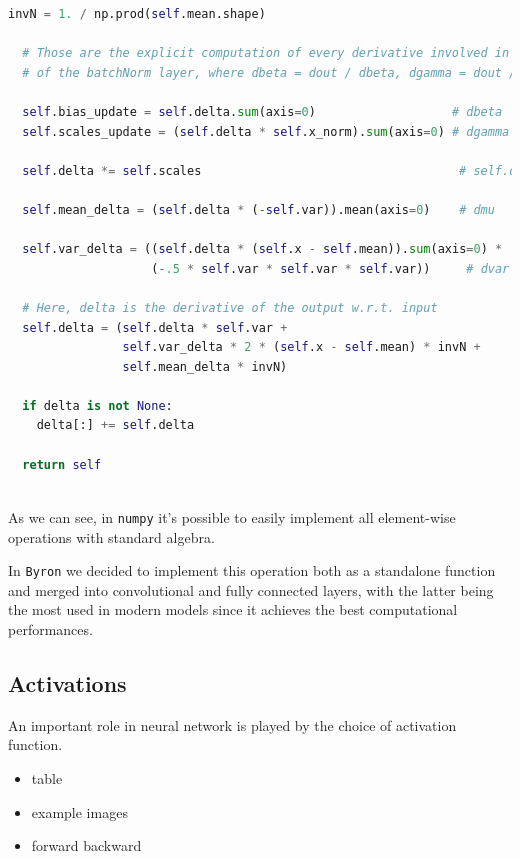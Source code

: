 \documentclass[12pt,a4paper]{report}
\begin{document}
\begin{lstlisting}[language=Python, caption=NumPyNet version of batchnorm function, label=code:py_batchnorm]
  invN = 1. / np.prod(self.mean.shape)

  # Those are the explicit computation of every derivative involved in BackPropagation
  # of the batchNorm layer, where dbeta = dout / dbeta, dgamma = dout / dgamma etc...

  self.bias_update = self.delta.sum(axis=0)                   # dbeta
  self.scales_update = (self.delta * self.x_norm).sum(axis=0) # dgamma

  self.delta *= self.scales                                    # self.delta = dx_norm from now on

  self.mean_delta = (self.delta * (-self.var)).mean(axis=0)    # dmu

  self.var_delta = ((self.delta * (self.x - self.mean)).sum(axis=0) *
                    (-.5 * self.var * self.var * self.var))     # dvar

  # Here, delta is the derivative of the output w.r.t. input
  self.delta = (self.delta * self.var +
                self.var_delta * 2 * (self.x - self.mean) * invN +
                self.mean_delta * invN)

  if delta is not None:
    delta[:] += self.delta

  return self
  
\end{lstlisting}

As we can see, in \texttt{numpy} it's possible to easily implement all element-wise operations with standard algebra.

In \texttt{Byron} we decided to implement this operation both as a standalone function and merged into convolutional and fully connected layers, with the latter being the most used in modern models since it achieves the best computational performances.

\subsection*{Activations}

An important role in neural network is played by the choice of activation function.

\begin{itemize}
 \item table
 \item example images
 \item forward backward
\end{itemize}
\end{document}
